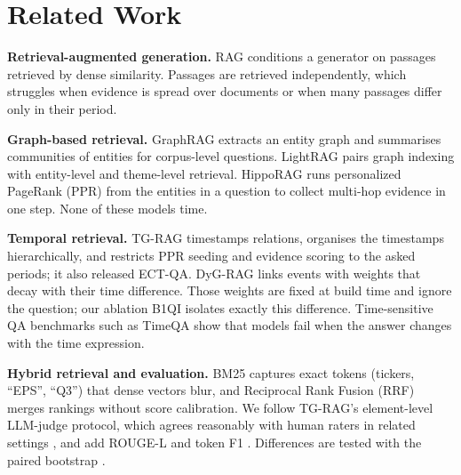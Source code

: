 \section{Related Work}
\textbf{Retrieval-augmented generation.} RAG \cite{lewis2020rag} conditions a generator on passages retrieved by dense similarity. Passages are retrieved independently, which struggles when evidence is spread over documents or when many passages differ only in their period.

\textbf{Graph-based retrieval.} GraphRAG \cite{edge2024graphrag} extracts an entity graph and summarises communities of entities for corpus-level questions. LightRAG \cite{guo2024lightrag} pairs graph indexing with entity-level and theme-level retrieval. HippoRAG \cite{gutierrez2024hipporag} runs personalized PageRank (PPR) \cite{page1999pagerank,haveliwala2002topic} from the entities in a question to collect multi-hop evidence in one step. None of these models time.

\textbf{Temporal retrieval.} TG-RAG \cite{han2025tgrag} timestamps relations, organises the timestamps hierarchically, and restricts PPR seeding and evidence scoring to the asked periods; it also released ECT-QA. DyG-RAG \cite{sun2025dygrag} links events with weights that decay with their time difference. Those weights are fixed at build time and ignore the question; our ablation B1QI isolates exactly this difference. Time-sensitive QA benchmarks such as TimeQA \cite{chen2021timeqa} show that models fail when the answer changes with the time expression.

\textbf{Hybrid retrieval and evaluation.} BM25 \cite{robertson2009bm25} captures exact tokens (tickers, ``EPS'', ``Q3'') that dense vectors blur, and Reciprocal Rank Fusion (RRF) \cite{cormack2009rrf} merges rankings without score calibration. We follow TG-RAG's element-level LLM-judge protocol, which agrees reasonably with human raters in related settings \cite{zheng2023judge}, and add ROUGE-L \cite{lin2004rouge} and token F1 \cite{rajpurkar2016squad}. Differences are tested with the paired bootstrap \cite{efron1993bootstrap,koehn2004significance}.
